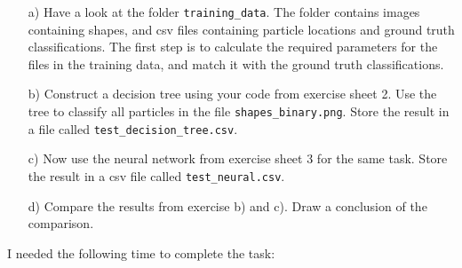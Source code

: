 \begin{enumerate}

\item[a)] Have a look at the folder \texttt{training\_data}. The folder contains images containing shapes, and csv files containing particle locations and ground truth classifications.
The first step is to calculate the required parameters for the files in the training data, and match it with the ground truth classifications.

\item[b)] Construct a decision tree using your code from exercise sheet 2. Use the tree to classify all particles in the file \texttt{shapes\_binary.png}. Store the result in a file called \texttt{test\_decision\_tree.csv}.

\item[c)] Now use the neural network from exercise sheet 3 for the same task. Store the result in a csv file called \texttt{test\_neural.csv}. 

\item[d)] Compare the results from exercise b) and c). Draw a conclusion of the comparison.

\end{enumerate}

I needed the following time to complete the task:

